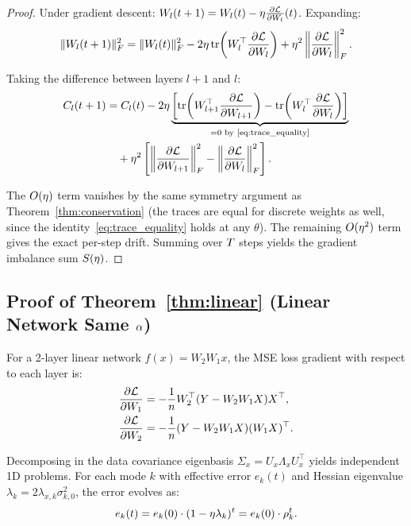 \begin{proof}
Under gradient descent: $W_l(t+1) = W_l(t) - \eta\frac{\partial\mathcal{L}}{\partial W_l}(t)$. Expanding:
\begin{equation}
    \|W_l(t+1)\|_F^2 = \|W_l(t)\|_F^2 - 2\eta\operatorname{tr}\!\left(W_l^\top\frac{\partial\mathcal{L}}{\partial W_l}\right) + \eta^2\left\|\frac{\partial\mathcal{L}}{\partial W_l}\right\|_F^2.
\end{equation}

Taking the difference between layers $l+1$ and $l$:
\begin{align}
    C_l(t+1) &= C_l(t) - 2\eta\underbrace{\left[\operatorname{tr}\!\left(W_{l+1}^\top\frac{\partial\mathcal{L}}{\partial W_{l+1}}\right) - \operatorname{tr}\!\left(W_l^\top\frac{\partial\mathcal{L}}{\partial W_l}\right)\right]}_{= 0 \text{ by~\eqref{eq:trace_equality}}} \\
    &\quad + \eta^2\left[\left\|\frac{\partial\mathcal{L}}{\partial W_{l+1}}\right\|_F^2 - \left\|\frac{\partial\mathcal{L}}{\partial W_l}\right\|_F^2\right]. \notag
\end{align}

The $O(\eta)$ term vanishes by the same symmetry argument as Theorem~\ref{thm:conservation} (the traces are equal for discrete weights as well, since the identity~\eqref{eq:trace_equality} holds at any $\theta$). The remaining $O(\eta^2)$ term gives the exact per-step drift. Summing over $T$ steps yields the gradient imbalance sum $S(\eta)$.
\end{proof}

\subsection{Proof of Theorem~\ref{thm:linear} (Linear Network Same $\alpha$)}
\label{app:proof:linear}

For a 2-layer linear network $f(x) = W_2 W_1 x$, the MSE loss gradient with respect to each layer is:
\begin{align}
    \frac{\partial\mathcal{L}}{\partial W_1} &= -\frac{1}{n} W_2^\top(Y - W_2 W_1 X)X^\top, \\
    \frac{\partial\mathcal{L}}{\partial W_2} &= -\frac{1}{n} (Y - W_2 W_1 X)(W_1 X)^\top.
\end{align}

Decomposing in the data covariance eigenbasis $\Sigma_x = U_x \Lambda_x U_x^\top$ yields independent 1D problems. For each mode $k$ with effective error $e_k(t)$ and Hessian eigenvalue $\lambda_k = 2\lambda_{x,k}\sigma_{k,0}^2$, the error evolves as:
\begin{equation}
    e_k(t) = e_k(0)\cdot(1-\eta\lambda_k)^t = e_k(0)\cdot\rho_k^t.
\end{equation}

